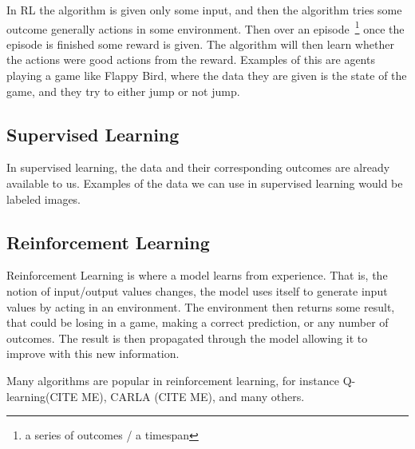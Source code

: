 In RL the algorithm is given only some input, and then the algorithm tries some outcome generally actions in some environment. Then over an episode~\footnote{a series of outcomes / a timespan} once the episode is finished some reward is given. The algorithm will then learn whether the actions were good actions from the reward. Examples of this are agents playing a game like Flappy Bird, where the data they are given is the state of the game, and they try to either jump or not jump.



\subsection{Supervised Learning}

In supervised learning, the data and their corresponding outcomes are already available to us. Examples of the data we can use in supervised learning would be labeled images.

\subsection{Reinforcement Learning}

Reinforcement Learning is where a model learns from experience. That is, the notion of input/output values changes, the model uses itself to generate input values by acting in an environment. The environment then returns some result, that could be losing in a game, making a correct prediction, or any number of outcomes. The result is then propagated through the model allowing it to improve with this new information.

Many algorithms are popular in reinforcement learning, for instance Q-learning(CITE ME), CARLA (CITE ME), 
and many others. 

